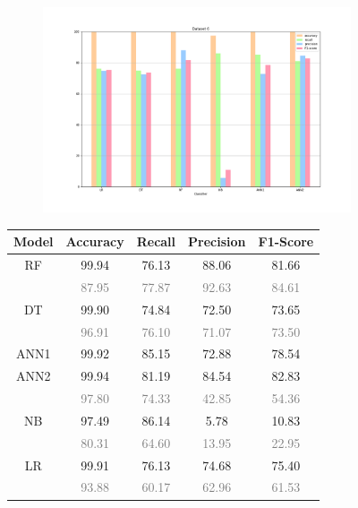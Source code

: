 \documentclass{Configuration_Files/PoliMi3i_thesis}
\begin{document}
\begin{figure}[H]
\centering
\begin{subfigure}
    \centering
    \includegraphics[scale=0.3]{Images/Dataset_6.png}
\end{subfigure}

\renewcommand{\arraystretch}{0.8}%
\begin{table}[H]
\centering 
    \begin{tabular}{ c  c  c  c  c }
    \hline 
    \textbf{Model}  & \textbf{Accuracy} & \textbf{Recall} & \textbf{Precision} & \textbf{F1-Score} \\
    \hline
    RF	& 99.94 &	76.13 &	88.06 &	81.66 \\
        & \footnotesize\textcolor{gray}{87.95} & \footnotesize\textcolor{gray}{77.87} & \footnotesize\textcolor{gray}{92.63} & \footnotesize\textcolor{gray}{84.61} \\[0.01cm]
    DT	& 99.90 & 74.84 &	72.50 &	73.65 \\
        & \footnotesize\textcolor{gray}{96.91} & \footnotesize\textcolor{gray}{76.10} & \footnotesize\textcolor{gray}{71.07} & \footnotesize\textcolor{gray}{73.50} \\
    ANN1 & 99.92 & 85.15 & 72.88 & 78.54 \\
    ANN2 & 99.94 & 81.19 & 84.54 & 82.83 \\
         & \footnotesize\textcolor{gray}{97.80} & \footnotesize\textcolor{gray}{74.33} & \footnotesize\textcolor{gray}{42.85} & \footnotesize\textcolor{gray}{54.36} \\
    NB	& 97.49 &	86.14 &	5.78 &	10.83 \\
        & \footnotesize\textcolor{gray}{80.31} & \footnotesize\textcolor{gray}{64.60} & \footnotesize\textcolor{gray}{13.95} & \footnotesize\textcolor{gray}{22.95} \\
    LR	& 99.91 &	76.13 &	74.68 &	75.40 \\
        & \footnotesize\textcolor{gray}{93.88} & \footnotesize\textcolor{gray}{60.17} & \footnotesize\textcolor{gray}{62.96} & \footnotesize\textcolor{gray}{61.53} \\
    \hline
    \end{tabular}
\end{table}


\end{figure}
\end{document}
